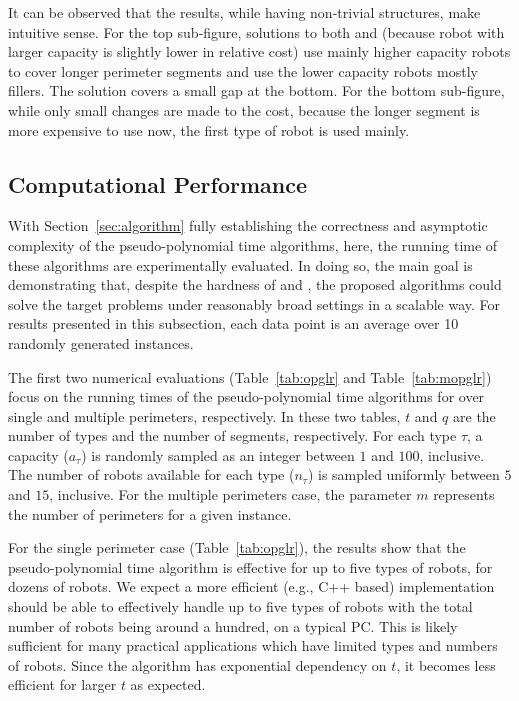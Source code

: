 It can be observed that the results, while having non-trivial structures, 
make intuitive sense. For the top sub-figure, solutions to both \opglr 
and \opgmc (because robot with larger capacity is slightly lower in 
relative cost) use mainly higher capacity robots to cover longer perimeter 
segments and use the lower capacity robots mostly fillers. The solution 
covers a small gap at the bottom. For the bottom sub-figure, while only 
small changes are made to the cost, because the longer segment is more 
expensive to use now, the first type of robot is used mainly. 

\subsection{Computational Performance}
With Section~\ref{sec:algorithm} fully establishing the correctness and 
asymptotic complexity of the pseudo-polynomial time algorithms, here, the 
running time of these algorithms are experimentally evaluated. In doing 
so, the main goal is demonstrating that, despite the hardness of \opglr 
and \opgmc, the proposed algorithms could solve the target problems under 
reasonably broad settings in a scalable way. For results presented in 
this subsection, each data point is an average over 10 randomly generated 
instances. 

The first two numerical evaluations (Table~\ref{tab:opglr} and 
Table~\ref{tab:mopglr}) focus on the running times of the pseudo-polynomial 
time algorithms for \opglr over single and multiple perimeters, 
respectively. In these two tables, $t$ and $q$ are the number of types 
and the number of segments, respectively. For each type $\tau$, a 
capacity ($a_{\tau}$) is randomly sampled as an integer between $1$ and 
$100$, inclusive. The number of robots available for each type ($n_{\tau}$) 
is sampled uniformly between $5$ and $15$, inclusive. For the multiple 
perimeters case, the parameter $m$ represents the number of perimeters for 
a given instance.

For the single perimeter case (Table~\ref{tab:opglr}), the results show 
that the pseudo-polynomial time algorithm is effective for up to five 
types of robots, for dozens of robots. We expect a more efficient 
(e.g., C++ based) implementation should be able to effectively handle 
up to five types of robots with the total number of robots being around 
a hundred, on a typical PC. This is likely sufficient for many practical 
applications which have limited types and numbers of robots. Since the 
algorithm has exponential dependency on $t$, it becomes less efficient 
for larger $t$ as expected.  

